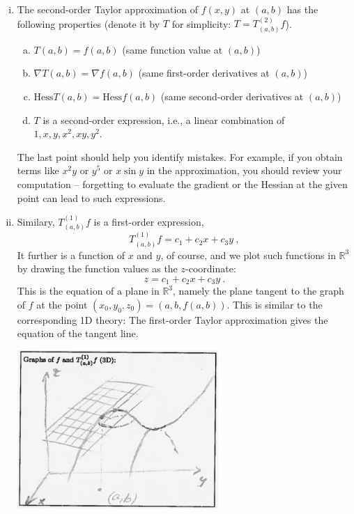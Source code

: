 \begin{remark}
\label{rem:taylor_appr}
\begin{enumerate}[(i)]
\item The second-order Taylor approximation of $f(x,y)$ at $(a,b)$ has the following properties (denote it by $T$ for simplicity: $T=T_{(a,b)}^{(2)}f$).
\begin{enumerate}[(a)]
	\item $T(a,b) = f(a,b)$ \hfill (same function value at $(a,b)$)
	\item $\nabla T(a,b) = \nabla f(a,b)$ \hfill (same first-order derivatives at $(a,b)$)
	\item $\mathrm{Hess}T(a,b) = \mathrm{Hess}f(a,b)$ \hfill (same second-order derivatives at $(a,b)$)
	\item $T$ is a second-order expression, i.e., a linear combination of $1,x,y,x^2,xy,y^2$.
\end{enumerate}
The last point should help you identify mistakes. For example, if you obtain terms like $x^2y$ or $y^5$ or $x \sin y$ in the approximation, you should review your computation -- forgetting to evaluate the gradient or the Hessian at the given point can lead to such expressions.
\item Similary, $T^{(1)}_{(a,b)}f$ is a first-order expression,
\[ T^{(1)}_{(a,b)}f = c_1 + c_2x +c_3y \:, \]
It further is a function of $x$ and $y$, of course, and we plot such functions in $\mathbb{R}^3$ by drawing the function values as the $z$-coordinate: 
\[ z = c_1 + c_2x +c_3y \:. \]
This is the equation of a plane in $\mathbb{R}^3$, namely the plane tangent to the graph of $f$ at the point $(x_0,y_0,z_0)=(a,b,f(a,b))$. This is similar to the corresponding 1D theory: The first-order Taylor approximation gives the equation of the tangent line.
\begin{center}
	\includegraphics[width=0.6\textwidth]{./Figures/f306.png}
\end{center}
\end{enumerate}
\end{remark}

